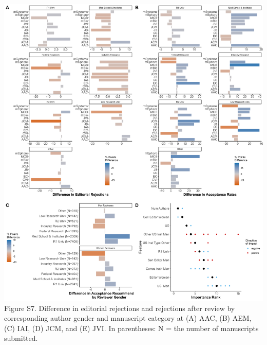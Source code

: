 \documentclass[11pt,]{article}
\begin{document}
\includegraphics{Figure_S7.png} Figure S7. Difference in editorial
rejections and rejections after review by corresponding author gender
and manuscript category at (A) AAC, (B) AEM, (C) IAI, (D) JCM, and (E)
JVI. In parentheses: N = the number of manuscripts submitted.

\newpage
\end{document}
